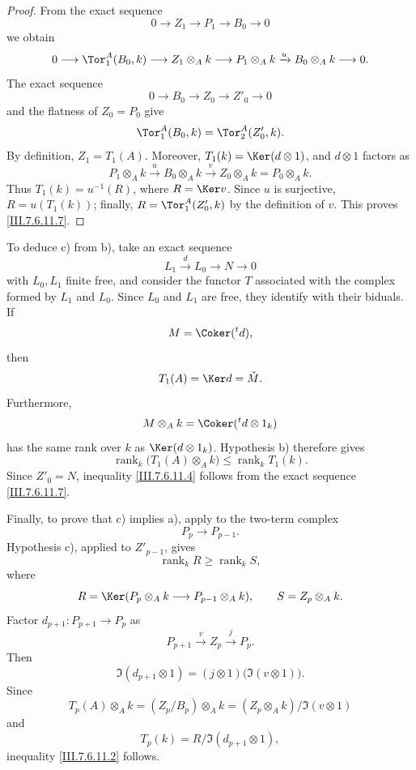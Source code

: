 {\begin{remarks}[7.6.11]
\begin{proof}
From the exact sequence
\[
  0\longrightarrow Z_1\longrightarrow P_1
  \longrightarrow B_0\longrightarrow0
\]
we obtain
\[
  0\longrightarrow\Tor_1^A(B_0,k)
  \longrightarrow Z_1\otimes_A k
  \longrightarrow P_1\otimes_A k
  \xrightarrow{u}B_0\otimes_A k
  \longrightarrow0.
\]
The exact sequence
\[
  0\longrightarrow B_0\longrightarrow Z_0
  \longrightarrow Z'_0\longrightarrow0
\]
and the flatness of $Z_0=P_0$ give
\[
  \Tor_1^A(B_0,k)=\Tor_2^A(Z'_0,k).
\]
By definition, $Z_1=T_1(A)$.  Moreover,
$T_1(k)=\Ker(d\otimes1)$, and $d\otimes1$ factors as
\[
  P_1\otimes_A k
  \xrightarrow{u}B_0\otimes_A k
  \xrightarrow{v}Z_0\otimes_A k
  =
  P_0\otimes_A k.
\]
Thus $T_1(k)=u^{-1}(R)$, where $R=\Ker v$.  Since $u$ is
surjective, $R=u(T_1(k))$; finally,
$R=\Tor_1^A(Z'_0,k)$ by the definition of $v$.  This proves
\eqref{III.7.6.11.7}.
\end{proof}

To deduce \textnormal{c)} from \textnormal{b)}, take an exact
sequence
\[
  L_1\xrightarrow{d}L_0\longrightarrow N\longrightarrow0
\]
with $L_0,L_1$ finite free, and consider the functor $T$
associated with the complex formed by $L_1$ and $L_0$.
Since $L_0$ and $L_1$ are free, they identify with their
biduals.  If
\[
  M=\Coker({}^t d),
\]
then
\[
  T_1(A)=\Ker d=\check M.
\]
Furthermore,
\[
  M\otimes_A k=\Coker({}^t d\otimes1_k)
\]
has the same rank over $k$ as $\Ker(d\otimes1_k)$.
Hypothesis \textnormal{b)} therefore gives
\[
  \operatorname{rank}_k\bigl(T_1(A)\otimes_A k\bigr)
  \leq
  \operatorname{rank}_kT_1(k).
\]
Since $Z'_0=N$, inequality \eqref{III.7.6.11.4} follows from
the exact sequence \eqref{III.7.6.11.7}.

Finally, to prove that \textnormal{c)} implies
\textnormal{a)}, apply  to the two-term
complex
\[
  P_p\longrightarrow P_{p-1}.
\]
Hypothesis \textnormal{c)}, applied to $Z'_{p-1}$, gives
\[
  \operatorname{rank}_k R\geq\operatorname{rank}_k S,
\]
where
\[
  R=\Ker(P_p\otimes_A k\longrightarrow P_{p-1}\otimes_A k),
  \qquad
  S=Z_p\otimes_A k.
\]
Factor $d_{p+1}:P_{p+1}\to P_p$ as
\[
  P_{p+1}\xrightarrow{v}Z_p\xrightarrow{j}P_p.
\]
Then
\[
  \Im(d_{p+1}\otimes1)
  =
  (j\otimes1)\bigl(\Im(v\otimes1)\bigr).
\]
Since
\[
  T_p(A)\otimes_A k
  =
  (Z_p/B_p)\otimes_A k
  =
  (Z_p\otimes_A k)/\Im(v\otimes1)
\]
and
\[
  T_p(k)=R/\Im(d_{p+1}\otimes1),
\]
inequality \eqref{III.7.6.11.2} follows.


\end{remarks}}
